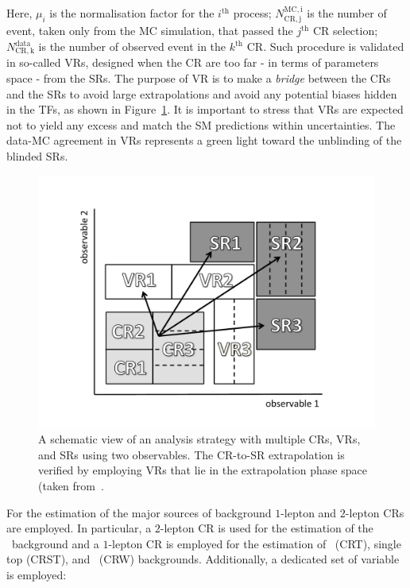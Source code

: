 		\noindent Here, $\mu_i$ is the normalisation factor for the $i^{\mathrm{th}}$ process; $N_{\mathrm{CR,j}}^{\mathrm{MC,i}}$ is the number of event, taken only from the \ac{MC} simulation, that passed the $j^{\mathrm{th}}$ CR selection; $N_{\mathrm{CR,k}}^{\mathrm{data}}$ is the number of observed event in the $k^{\mathrm{th}}$ \ac{CR}. Such procedure is validated in so-called \acp{VR}, designed when the \ac{CR} are too far - in terms of parameters space - from the \acp{SR}. The purpose of \ac{VR} is to make a \emph{bridge} between the \acp{CR} and the \acp{SR} to avoid large extrapolations and avoid any potential biases hidden in the \acp{TF}, as shown in Figure~\ref{fig:extrapolation}. It is important to stress that \acp{VR} are expected not to yield any excess and match the \ac{SM} predictions within uncertainties. The data-\ac{MC} agreement in \acp{VR} represents a green light toward the unblinding of the blinded \acp{SR}.

		\begin{figure}[!htb]
		  \begin{center}
		   \includegraphics[width=\textwidth]{figures/stop/cartoon_CRVRSR_bw}
		   \caption{A schematic view of an analysis strategy with multiple \acp{CR}, \acp{VR}, and \acp{SR} using two observables. The \ac{CR}-to-\ac{SR} extrapolation is verified by employing \acp{VR} that lie in the extrapolation phase space (taken from~\cite{histfitter}.}
		   \label{fig:extrapolation}
		  \end{center}
		\end{figure}

		For the estimation of the major sources of background $1$-lepton and $2$-lepton \acp{CR} are employed. In particular, a $2$-lepton \ac{CR} is used for the estimation of the \Zjets\ background and a $1$-lepton \ac{CR} is employed for the estimation of \ttbar\ (CRT), single top (CRST), and \Wjets\ (CRW) backgrounds. Additionally, a dedicated set of variable is employed:

